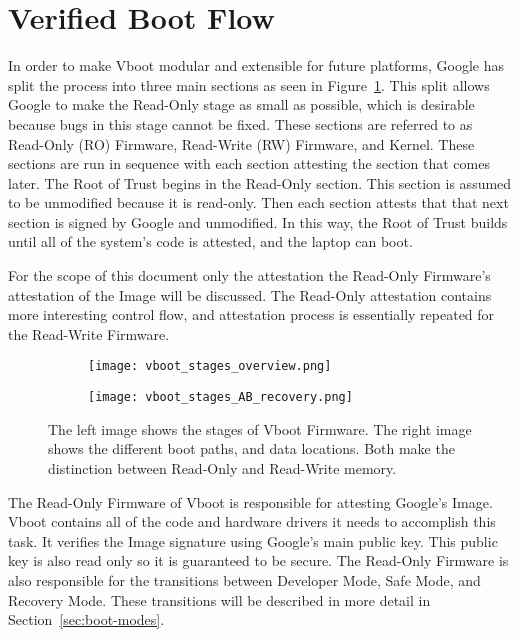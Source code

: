 \section{Verified Boot Flow}

In order to make Vboot modular and extensible for future platforms, Google has split the process into three main sections as seen in Figure~\ref{fig:vboot_stages_overview}.
This split allows Google to make the Read-Only stage as small as possible, which
is desirable because bugs in this stage cannot be fixed.
These sections are referred to as Read-Only (RO) Firmware, Read-Write
(RW) Firmware, and Kernel.
These sections are run in sequence with each section attesting the section that comes later.
The Root of Trust begins in the Read-Only section.
This section is assumed to be unmodified because it is read-only.
Then each section attests that that next section is signed by Google and
unmodified. 
In this way, the Root of Trust builds until all of the system's code is
attested, and the laptop can boot.

For the scope of this document only the attestation the Read-Only Firmware's
attestation of the Image will be discussed.
The Read-Only attestation contains more interesting control flow, and
attestation process is essentially repeated for the Read-Write Firmware.

\begin{figure}
\begin{subfigure}{.4\textwidth}
  \centering
  \texttt{[image: vboot\_stages\_overview.png]}
\end{subfigure}
\begin{subfigure}{.60\textwidth}
  \centering
  \texttt{[image: vboot\_stages\_AB\_recovery.png]}
\end{subfigure}
\caption[Verified Boot Stages]{The left image shows the stages of Vboot
    Firmware\cite{fw-summit}. The right image
    shows the different boot paths, and data locations\cite{fw-summit}. Both make the distinction
between Read-Only and Read-Write memory.}
\label{fig:vboot_stages_overview}
\end{figure}

The Read-Only Firmware of Vboot is responsible for attesting Google's Image. 
Vboot contains all of the code and hardware drivers it needs to accomplish this task.
It verifies the Image signature using Google's main public key.
This public key is also read only so it is guaranteed to be secure.
The Read-Only Firmware is also responsible for the transitions between Developer Mode, Safe Mode, and Recovery Mode.
These transitions will be described in more detail in Section~\ref{sec:boot-modes}.

